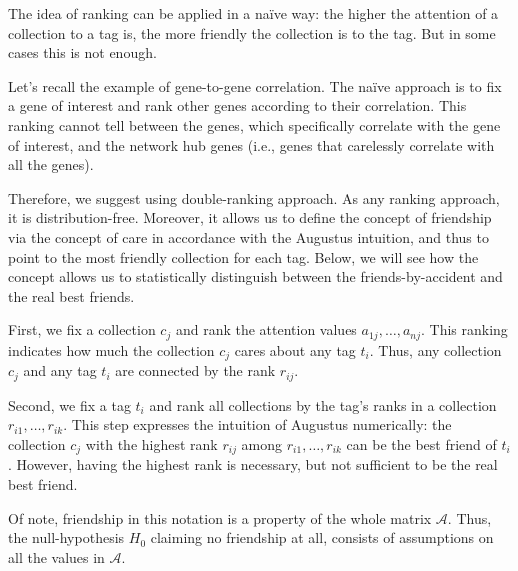 \documentclass{llncs}
\begin{document}
The idea of ranking can be applied in a na\"ive way: the higher the attention of a collection to a tag is, the more friendly the collection is to the tag. But in some cases this is not enough.

Let's recall the example of gene-to-gene correlation. The na\"ive approach is to fix a gene of interest and rank other genes according to their correlation. This ranking cannot tell between the genes, which specifically correlate with the gene of interest, and the network hub genes (i.e., genes that carelessly correlate with all the genes). 

Therefore, we suggest using double-ranking approach. As any ranking approach, it is distribution-free. Moreover, it allows us to define the concept of friendship via the concept of care in accordance with the Augustus intuition, and thus to point to the most friendly collection for each tag. \textcolor{airforceblue}{Below, we will see how the concept allows us to statistically distinguish between the friends-by-accident and the real best friends.}


First, we fix a collection $c_j$ and rank the attention values $a_{1j}, \dots, a_{nj}$. This ranking indicates how much the collection $c_j$ cares about any tag $t_i$. Thus, any collection $c_{j}$ and any tag $t_i$ are connected by the rank $r_{ij}$.

Second, we fix a tag $t_i$ and rank all collections by the tag's ranks in a collection $r_{i1}, \dots, r_{ik}$.
This step expresses the intuition of Augustus numerically: the collection $c_j$ with the highest rank $r_{ij}$ among $r_{i1}, \dots, r_{ik}$ can be the best friend of $t_i$. However, having the highest rank is necessary, but not sufficient to be the real best friend.

Of note, friendship in this notation is a property of the whole matrix $\mathcal{A}$. Thus, the null-hypothesis $H_0$ claiming no friendship at all, consists of assumptions on all the values in $\mathcal{A}$.
\end{document}
